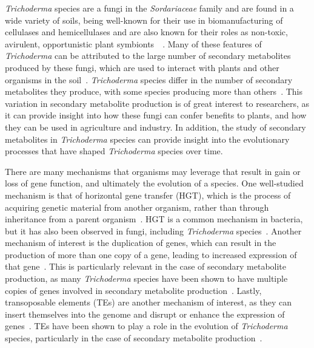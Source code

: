 \textit{Trichoderma} species are a fungi in the \textit{Sordariaceae} family and are found in a wide variety of soils, being well-known for their use in biomanufacturing
of cellulases and hemicellulases and are also known for their roles as non-toxic,
avirulent, opportunistic plant symbionts~\cite{woo2023a}~\cite{kubicek2019a}. 
Many of these features of \textit{Trichoderma}
can be attributed to the large number of secondary metabolites
produced by these fungi, which are used to interact with plants and other organisms in the soil~\cite{Mukherjee2012}. \textit{Trichoderma} species differ in the number of secondary metabolites they produce, with some species producing more than others~\cite{Mukherjee2012}. This variation in secondary metabolite production is of great interest to researchers, as it can provide insight into how these fungi can confer benefits to plants, and how they can be used in agriculture and industry. In addition, the study of secondary metabolites in \textit{Trichoderma} species can provide insight into
the evolutionary processes that have shaped \textit{Trichoderma} species over time.

There are many mechanisms that organisms may leverage that result in gain or loss of gene function, and ultimately the evolution of a species. One well-studied mechanism is that of horizontal gene transfer (HGT), which is the process of acquiring genetic material from another organism, rather than through inheritance from a parent organism~\cite{goncalves2024}. HGT is a common mechanism in bacteria, but it has also been observed in fungi, including \textit{Trichoderma} species~\cite{goncalves2024}. Another mechanism of interest is the duplication of genes, which can result in the production of more than one copy of a gene, leading to increased expression of that gene~\cite{goncalves2024}. This is particularly relevant in the case of secondary metabolite production, as many \textit{Trichoderma} species have been shown to have multiple copies of genes involved in secondary metabolite production~\cite{Mukherjee2012}. Lastly, transoposable elements (TEs) are another mechanism of interest, as they can insert themselves into the genome and disrupt or enhance the expression of genes~\cite{goncalves2024}. TEs have been shown to play a role in the evolution of \textit{Trichoderma} species, particularly in the case of secondary metabolite production~\cite{goncalves2024}. 

